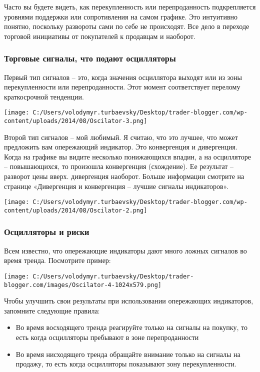 \documentclass[a5paper]{article}
\begin{document}
Часто вы будете видеть, как перекупленность или перепроданность
подкрепляется уровнями поддержки или сопротивления на самом
графике. Это интуитивно понятно, поскольку развороты сами по себе не
происходят. Все дело в переходе торговой инициативы от покупателей к
продавцам и наоборот.

\subsubsection{Торговые сигналы, что подают осцилляторы}

Первый тип сигналов – это, когда значения осциллятора выходят или из зоны перекупленности или перепроданности. Этот момент соответствует перелому краткосрочной тенденции.

\texttt{[image: C:/Users/volodymyr.turbaevsky/Desktop/trader-blogger.com/wp-content/uploads/2014/08/Oscilator-3.png]}

Второй тип сигналов – мой любимый. Я считаю, что это лучшее, что может
предложить вам опережающий индикатор. Это конвергенция и
дивергенция. Когда на графике вы видите несколько понижающихся впадин,
а на осцилляторе – повышающихся, то произошла конвергенция
(схождение). Ее результат – разворот цены вверх. дивергенция
наоборот. Больше информации смотрите на странице «Дивергенция и
конвергенция – лучшие сигналы индикаторов».

\texttt{[image: C:/Users/volodymyr.turbaevsky/Desktop/trader-blogger.com/wp-content/uploads/2014/08/Oscilator-2.png]}

\subsubsection{Осцилляторы и риски}

Всем известно, что опережающие индикаторы дают много ложных сигналов
во время тренда. Посмотрите пример:

\texttt{[image: C:/Users/volodymyr.turbaevsky/Desktop/trader-blogger.com/images/Oscilator-4-1024x579.png]}

Чтобы улучшить свои результаты при использовании опережающих индикаторов, запомните следующие правила:
\begin{itemize}
\item     Во время восходящего тренда реагируйте только на сигналы на покупку, то есть когда осцилляторы пребывают в зоне перепроданности
\item     Во время нисходящего тренда обращайте внимание только на сигналы на продажу, то есть когда осцилляторы показывают зону перекупленности.
\end{itemize}
\end{document}
